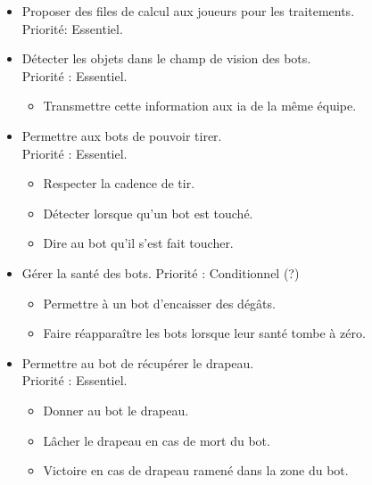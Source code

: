 \documentclass[french]{article}
\begin{document}
\begin{itemize}
        \item Proposer des files de calcul aux joueurs pour les traitements.\\
            Priorité: Essentiel.\\

                
        \item Détecter les objets dans le champ de vision des bots. \\
            Priorité : Essentiel.
            \begin{itemize}
                \item Transmettre cette information aux ia de la même équipe.\\
            \end{itemize}
        
        \item Permettre aux bots de pouvoir tirer. \\
            Priorité : Essentiel.
            \begin{itemize}
                \item Respecter la cadence de tir.
                \item Détecter lorsque qu'un bot est touché.
                \item Dire au bot qu'il s'est fait toucher. \\
            \end{itemize}

        \item Gérer la santé des bots.
            Priorité : Conditionnel (?)
            \begin{itemize}
                \item Permettre à un bot d'encaisser des dégâts.
                \item Faire réapparaître les bots lorsque leur santé tombe à zéro. \\
            \end{itemize}
        

        \item Permettre au bot de récupérer le drapeau. \\
            Priorité : Essentiel.
            \begin{itemize}
                \item Donner au bot le drapeau.
                \item Lâcher le drapeau en cas de mort du bot.
                \item Victoire en cas de drapeau ramené dans la zone du bot. \\
            \end{itemize}
        

\end{itemize}
\end{document}
